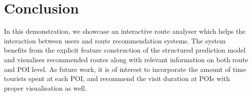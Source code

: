 \section{Conclusion}
In this demonstration, we showcase an interactive route analyser which helps the interaction between users and route recommendation systems. 
The system benefits from the explicit feature construction of the structured prediction model and visualises recommended routes along with relevant information on both route and POI level.
As future work, it is of interest to incorporate %
the amount of time tourists spent at each POI, 
and recommend the visit duration at POIs with proper visualisation as well.
